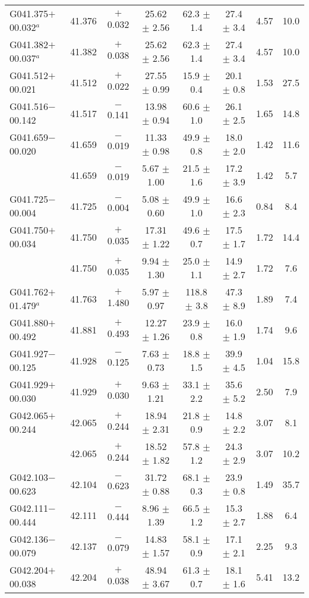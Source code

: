 \begin{ThreePartTable}
\begin{longtable}{lccccccc}
G041.375$+$00.032$^a$ &41.376&	$+$0.032	&25.62	$\pm$ 2.56	&62.3	$\pm$ 1.4	&27.4	$\pm$ 3.4	&4.57	&10.0\\
G041.382$+$00.037$^a$ &41.382&	$+$0.038	&25.62	$\pm$ 2.56	&62.3	$\pm$ 1.4	&27.4	$\pm$ 3.4	&4.57	&10.0\\
G041.512$+$00.021     &41.512&	$+$0.022	&27.55	$\pm$ 0.99	&15.9	$\pm$ 0.4	&20.1	$\pm$ 0.8	&1.53	&27.5\\
G041.516$-$00.142     &41.517&	$-$0.141	&13.98	$\pm$ 0.94	&60.6	$\pm$ 1.0	&26.1	$\pm$ 2.5	&1.65	&14.8\\
G041.659$-$00.020     &41.659&	$-$0.019	&11.33	$\pm$ 0.98	&49.9	$\pm$ 0.8	&18.0	$\pm$ 2.0	&1.42	&11.6\\
                      &41.659&	$-$0.019	&5.67	$\pm$ 1.00	&21.5	$\pm$ 1.6	&17.2	$\pm$ 3.9	&1.42	&5.7\\
G041.725$-$00.004     &41.725&	$-$0.004	&5.08	$\pm$ 0.60	&49.9	$\pm$ 1.0	&16.6	$\pm$ 2.3	&0.84	&8.4\\
G041.750$+$00.034     &41.750&	$+$0.035	&17.31	$\pm$ 1.22	&49.6	$\pm$ 0.7	&17.5	$\pm$ 1.7	&1.72	&14.4\\
                      &41.750&	$+$0.035	&9.94	$\pm$ 1.30	&25.0	$\pm$ 1.1	&14.9	$\pm$ 2.7	&1.72	&7.6\\
G041.762$+$01.479$^a$ &41.763&	$+$1.480	&5.97	$\pm$ 0.97	&118.8	$\pm$ 3.8	&47.3	$\pm$ 8.9	&1.89	&7.4\\
G041.880$+$00.492     &41.881&	$+$0.493	&12.27	$\pm$ 1.26	&23.9	$\pm$ 0.8	&16.0	$\pm$ 1.9	&1.74	&9.6\\
G041.927$-$00.125     &41.928&	$-$0.125	&7.63	$\pm$ 0.73	&18.8	$\pm$ 1.5	&39.9	$\pm$ 4.5	&1.04	&15.8\\
G041.929$+$00.030     &41.929&	$+$0.030	&9.63	$\pm$ 1.21	&33.1	$\pm$ 2.2	&35.6	$\pm$ 5.2	&2.50	&7.9\\
G042.065$+$00.244     &42.065&	$+$0.244	&18.94	$\pm$ 2.31	&21.8	$\pm$ 0.9	&14.8	$\pm$ 2.2	&3.07	&8.1\\
                      &42.065&	$+$0.244	&18.52	$\pm$ 1.82	&57.8	$\pm$ 1.2	&24.3	$\pm$ 2.9	&3.07	&10.2\\
G042.103$-$00.623     &42.104&	$-$0.623	&31.72	$\pm$ 0.88	&68.1	$\pm$ 0.3	&23.9	$\pm$ 0.8	&1.49	&35.7\\
G042.111$-$00.444     &42.111&	$-$0.444	&8.96	$\pm$ 1.39	&66.5	$\pm$ 1.2	&15.3	$\pm$ 2.7	&1.88	&6.4\\
G042.136$-$00.079     &42.137&	$-$0.079	&14.83	$\pm$ 1.57	&58.1	$\pm$ 0.9	&17.1	$\pm$ 2.1	&2.25	&9.3\\
G042.204$+$00.038     &42.204&	$+$0.038	&48.94	$\pm$ 3.67	&61.3	$\pm$ 0.7	&18.1	$\pm$ 1.6	&5.41	&13.2\\

\end{longtable}
\end{ThreePartTable}
